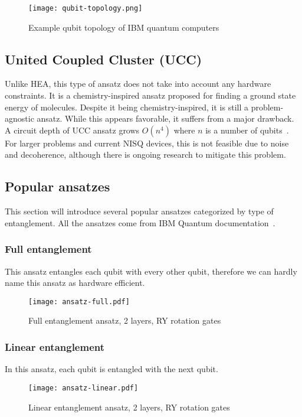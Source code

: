 \begin{figure}[H]
    \texttt{[image: qubit-topology.png]}
    \caption{Example qubit topology of IBM quantum computers~\cite{img:topology}}
    \label{fig:qubit_topology}
\end{figure}

\subsection{United Coupled Cluster (UCC)}
Unlike HEA, this type of ansatz does not take into account any hardware constraints. It is a chemistry-inspired ansatz proposed for finding a ground state energy of molecules. Despite it being chemistry-inspired, it is still a problem-agnostic ansatz. While this appears favorable, it suffers from a major drawback. A circuit depth of UCC ansatz grows $O(n^4)$ where $n$ is a number of qubits~\cite{ucc_ansatz}. For larger problems and current NISQ devices, this is not feasible due to noise and decoherence, although there is ongoing research to mitigate this problem.
  
\subsection{Popular ansatzes}
This section will introduce several popular ansatzes categorized by type of entanglement. All the ansatzes come from IBM Quantum documentation~\cite{twolocal}. 

\subsubsection{Full entanglement}
This ansatz entangles each qubit with every other qubit, therefore we can hardly name this ansatz as hardware efficient.
\begin{figure}[H]
    \centering
    \texttt{[image: ansatz-full.pdf]}
    \caption{Full entanglement ansatz, 2 layers, RY rotation gates}
\end{figure}

\subsubsection{Linear entanglement}
In this ansatz, each qubit is entangled with the next qubit. 
\begin{figure}[H]
    \centering
    \texttt{[image: ansatz-linear.pdf]}
    \caption{Linear entanglement ansatz, 2 layers, RY rotation gates}
\end{figure}

